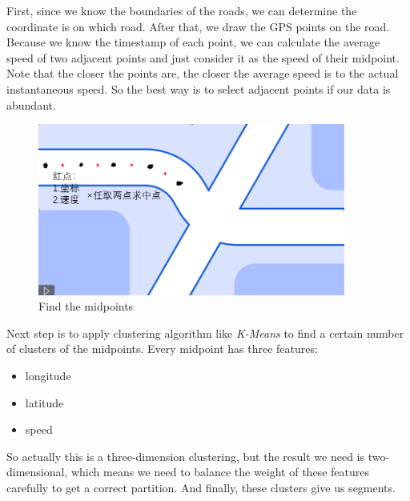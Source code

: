 \documentclass[fontset=none]{ctexart}
\theoremstyle{definition}
\theoremstyle{remark}
\begin{document}
First, since we know the boundaries of the roads, we can determine the coordinate is on which road.
After that, we draw the GPS points on the road. Because we know the timestamp of each point, we can 
calculate the average speed of two adjacent points and just consider it as the speed of their midpoint.
Note that the closer the points are, the closer the average speed is to the actual instantaneous speed.
So the best way is to select adjacent points if our data is abundant.
\begin{figure}[htb]
  \centering
  \includegraphics[width=0.9\textwidth]{images/midpoints.png}
  \caption{Find the midpoints}
  \label{fig: midpoint}
\end{figure}

Next step is to apply clustering algorithm like \textit{K-Means} to find a certain number of clusters
of the midpoints.
Every midpoint has three features:
\begin{itemize}
  \item longitude
  \item latitude
  \item speed
\end{itemize}

So actually this is a three-dimension clustering, but the result we need is two-dimensional, which means
we need to balance the weight of these features carefully to get a correct partition.
And finally, these clusters give us segments.
\begin{figure}[h]
  \centering
  \quad
\end{figure}
\end{document}
